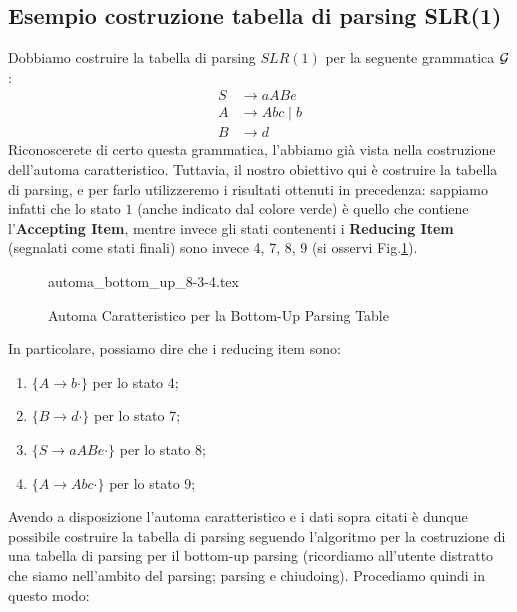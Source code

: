 \documentclass[class=book, crop=false, oneside, 12pt]{standalone}
\begin{document}
\subsection{Esempio costruzione tabella di parsing SLR(1)}
Dobbiamo costruire la tabella di parsing \(SLR(1)\) per la seguente grammatica \(\mathcal{G}\):
\begin{align*}
    S &\rightarrow aABe \\
    A &\rightarrow Abc \mid b \\
    B &\rightarrow d
\end{align*}
Riconoscerete di certo questa grammatica, l'abbiamo già vista nella costruzione dell'automa caratteristico. Tuttavia, il nostro obiettivo qui è costruire la tabella di parsing, e per farlo utilizzeremo i risultati ottenuti in precedenza: sappiamo infatti che lo stato \(1\) (anche indicato dal colore verde) è quello che contiene l'\textbf{Accepting Item}, mentre invece gli stati contenenti i \textbf{Reducing Item} (segnalati come stati finali) sono invece 4, 7, 8, 9 (si osservi Fig.\ref{fig:charateristic-automata-complete}). 
\begin{figure}
    \centering
	{automa_bottom_up_8-3-4.tex}
    \caption{Automa Caratteristico per la Bottom-Up Parsing Table}
    \label{fig:charateristic-automata-complete}    
\end{figure}
In particolare, possiamo dire che i reducing item sono:
\begin{enumerate}
    \item \(\{A \rightarrow b \cdot\}\) per lo stato 4;
    \item \(\{B \rightarrow d \cdot\}\) per lo stato 7;
    \item \(\{S \rightarrow aABe \cdot\}\) per lo stato 8;
    \item \(\{A \rightarrow Abc \cdot\}\) per lo stato 9;
\end{enumerate}
Avendo a disposizione l'automa caratteristico e i dati sopra citati è dunque possibile costruire la tabella di parsing seguendo l'algoritmo per la costruzione di una tabella di parsing per il bottom-up parsing (ricordiamo all'utente distratto che siamo nell'ambito del parsing; parsing e chiudoing). Procediamo quindi in questo modo:
\end{document}
